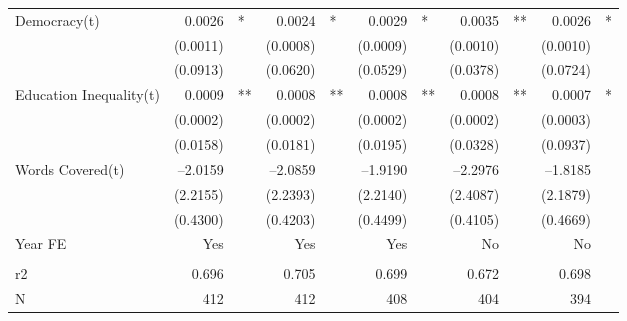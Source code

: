 \begin{tabular} {l* {5}{r @{} l}}
Democracy(t)&      0.0026&*  &      0.0024&*  &      0.0029&*  &      0.0035&** &      0.0026&*  \\
            &    (0.0011)&   &    (0.0008)&   &    (0.0009)&   &    (0.0010)&   &    (0.0010)&   \\
            &    (0.0913)&   &    (0.0620)&   &    (0.0529)&   &    (0.0378)&   &    (0.0724)&   \\
Education Inequality(t)&      0.0009&** &      0.0008&** &      0.0008&** &      0.0008&** &      0.0007&*  \\
            &    (0.0002)&   &    (0.0002)&   &    (0.0002)&   &    (0.0002)&   &    (0.0003)&   \\
            &    (0.0158)&   &    (0.0181)&   &    (0.0195)&   &    (0.0328)&   &    (0.0937)&   \\
Words Covered(t)&    --2.0159&   &    --2.0859&   &    --1.9190&   &    --2.2976&   &    --1.8185&   \\
            &    (2.2155)&   &    (2.2393)&   &    (2.2140)&   &    (2.4087)&   &    (2.1879)&   \\
            &    (0.4300)&   &    (0.4203)&   &    (0.4499)&   &    (0.4105)&   &    (0.4669)&   \\
Year FE     &         Yes&   &         Yes&   &         Yes&   &          No&   &          No&   \\
 \\
r2          &       0.696&   &       0.705&   &       0.699&   &       0.672&   &       0.698&   \\
N           &         412&   &         412&   &         408&   &         404&   &         394&   \\
\hline
\end{tabular}
